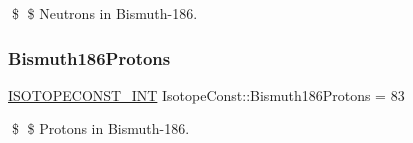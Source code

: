 \$ \$ Neutrons in Bismuth-\/186. \mbox{\label{group___isotope_const-_bismuth-_bi186_gaa15e512e320ab81fabafc28a8792ddf1}} 
\subsubsection{\texorpdfstring{Bismuth186\+Protons}{Bismuth186Protons}}
{\footnotesize\ttfamily \mbox{\hyperlink{group___isotope_const-_macros_ga5f18360b3e99483a35c32d789e62621c}{I\+S\+O\+T\+O\+P\+E\+C\+O\+N\+S\+T\+\_\+\+I\+NT}} Isotope\+Const\+::\+Bismuth186\+Protons = 83}

\$ \$ Protons in Bismuth-\/186. 